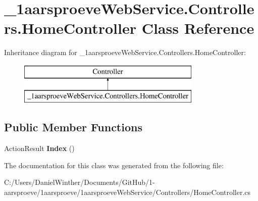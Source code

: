\hypertarget{class__1aarsproeve_web_service_1_1_controllers_1_1_home_controller}{}\section{\+\_\+1aarsproeve\+Web\+Service.\+Controllers.\+Home\+Controller Class Reference}
\label{class__1aarsproeve_web_service_1_1_controllers_1_1_home_controller}
Inheritance diagram for \+\_\+1aarsproeve\+Web\+Service.\+Controllers.\+Home\+Controller\+:\begin{figure}[H]
\begin{center}
\leavevmode
\includegraphics[height=2.000000cm]{class__1aarsproeve_web_service_1_1_controllers_1_1_home_controller}
\end{center}
\end{figure}
\subsection*{Public Member Functions}
\begin{DoxyCompactItemize}
\item 
\hypertarget{class__1aarsproeve_web_service_1_1_controllers_1_1_home_controller_afeaf8faefb53b2651fbdcbd4c743496c}{}Action\+Result {\bfseries Index} ()\label{class__1aarsproeve_web_service_1_1_controllers_1_1_home_controller_afeaf8faefb53b2651fbdcbd4c743496c}

\end{DoxyCompactItemize}


The documentation for this class was generated from the following file\+:\begin{DoxyCompactItemize}
\item 
C\+:/\+Users/\+Daniel\+Winther/\+Documents/\+Git\+Hub/1-\/aarsproeve/1aarsproeve/1aarsproeve\+Web\+Service/\+Controllers/Home\+Controller.\+cs\end{DoxyCompactItemize}
